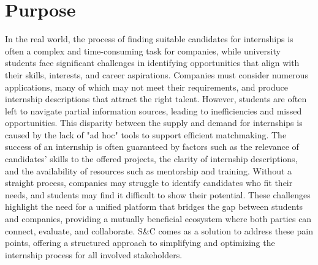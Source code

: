 \section{Purpose}
\label{sec:purpose}%
In the real world, the process of finding suitable candidates for internships is often a complex and time-consuming task for companies, while university students face significant challenges in identifying opportunities that align with their skills, interests, and career aspirations. Companies must consider numerous applications, many of which may not meet their requirements, and produce internship descriptions that attract the right talent. However, students are often left to navigate partial information sources, leading to inefficiencies and missed opportunities.
This disparity between the supply and demand for internships is caused by the lack of "ad hoc" tools to support efficient matchmaking. The success of an internship is often guaranteed by factors such as the relevance of candidates' skills to the offered projects, the clarity of internship descriptions, and the availability of resources such as mentorship and training. Without a straight process, companies may struggle to identify candidates who fit their needs, and students may find it difficult to show their potential.
These challenges highlight the need for a unified platform that bridges the gap between students and companies, providing a mutually beneficial ecosystem where both parties can connect, evaluate, and collaborate. S\&C comes as a solution to address these pain points, offering a structured approach to simplifying and optimizing the internship process for all involved stakeholders.

